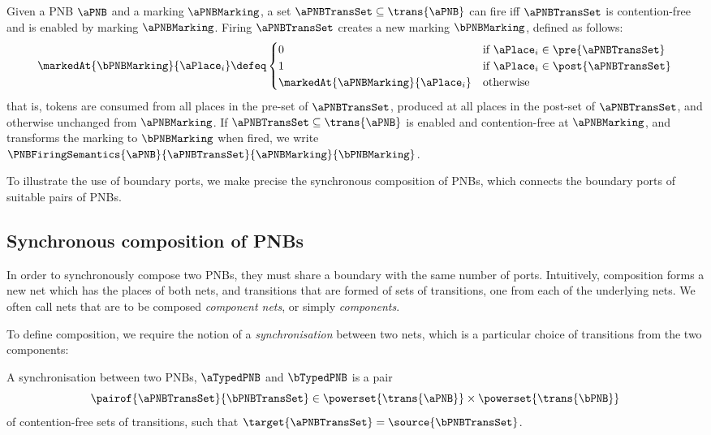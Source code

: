 \begin{definition} \label{defn:firePNBTransitions}
Given a PNB $\aPNB$ and a marking $\aPNBMarking$, a set $\aPNBTransSet
\subseteq \trans{\aPNB}$ can fire iff $\aPNBTransSet$ is contention-free and is
enabled by marking $\aPNBMarking$.
Firing $\aPNBTransSet$ creates a new marking $\bPNBMarking$, defined as follows:
\[
    \markedAt{\bPNBMarking}{\aPlace_i} \defeq \begin{cases}
        0 & \mbox{if } \aPlace_i \in \pre{\aPNBTransSet} \\
        1 & \mbox{if } \aPlace_i \in \post{\aPNBTransSet} \\
        \markedAt{\aPNBMarking}{\aPlace_i} & \mbox{otherwise}
    \end{cases}
\]
that is, tokens are consumed from all places in the pre-set of $\aPNBTransSet$,
produced at all places in the post-set of $\aPNBTransSet$, and otherwise
unchanged from $\aPNBMarking$. If $\aPNBTransSet \subseteq \trans{\aPNB}$ is
enabled and contention-free at $\aPNBMarking$, and transforms the
marking to $\bPNBMarking$ when fired, we write
$\PNBFiringSemantics{\aPNB}{\aPNBTransSet}{\aPNBMarking}{\bPNBMarking}$.
\end{definition}

To illustrate the use of boundary ports, we make precise the synchronous
composition of PNBs, which connects the boundary ports of suitable pairs of
PNBs.

\subsection{Synchronous composition of PNBs}
\label{sec:nwbComposition}

In order to synchronously compose two PNBs, they must share a boundary with the
same number of ports. Intuitively, composition forms a new net which has the
places of both nets, and transitions that are formed of sets of transitions,
one from each of the underlying nets. We often call nets that are to be
composed \emph{component nets}, or simply \emph{components}.

To define composition, we require the notion of a \emph{synchronisation}
between two nets, which is a particular choice of transitions from the two
components:

\begin{definition}[Synchronisations]\label{defn:synch}
    A synchronisation between two PNBs, $\aTypedPNB$ and $\bTypedPNB$ is a pair
    \[
        \pairof{\aPNBTransSet}{\bPNBTransSet} \in \powerset{\trans{\aPNB}} \times
    \powerset{\trans{\bPNB}}
    \]
    of contention-free sets of transitions, such that $\target{\aPNBTransSet} =
    \source{\bPNBTransSet}$.
\end{definition}

